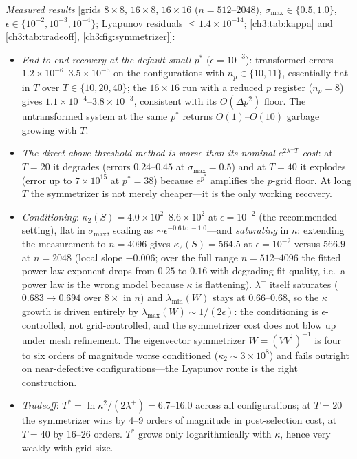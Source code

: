 \emph{Measured results} [grids $8\times8$, $16\times8$, $16\times16$
($n=512$--$2048$), $\sigma_{\max}\in\{0.5,1.0\}$,
$\epsilon\in\{10^{-2},10^{-3},10^{-4}\}$; Lyapunov residuals
$\le1.4\times10^{-14}$; \ref{ch3:tab:kappa} and \ref{ch3:tab:tradeoff},
\ref{ch3:fig:symmetrizer}]:
\begin{itemize}
\item \emph{End-to-end recovery at the default small $p^{*}$}
  ($\epsilon=10^{-3}$): transformed errors
  $1.2\times10^{-6}$--$3.5\times10^{-5}$ on the configurations with
  $n_p\in\{10,11\}$, essentially flat in $T$ over $T\in\{10,20,40\}$; the
  $16\times16$ run with a reduced $p$ register ($n_p=8$) gives
  $1.1\times10^{-4}$--$3.8\times10^{-3}$, consistent with its
  $O(\Delta p^{2})$ floor.  The untransformed system at the same $p^{*}$
  returns $O(1)$--$O(10)$ garbage growing with $T$.
\item \emph{The direct above-threshold method is worse than its nominal
  $e^{2\lambda^{+}T}$ cost}: at $T=20$ it degrades (errors $0.24$--$0.45$
  at $\sigma_{\max}=0.5$) and at $T=40$ it explodes (error up to
  $7\times10^{15}$ at $p^{*}=38$) because $e^{p^{*}}$ amplifies the
  $p$-grid floor.  At long $T$ the symmetrizer is not merely cheaper---it
  is the only working recovery.
\item \emph{Conditioning}:
  $\kappa_2(S)=4.0\times10^{2}$--$8.6\times10^{2}$ at $\epsilon=10^{-2}$
  (the recommended setting), flat in $\sigma_{\max}$, scaling as
  ${\sim}\epsilon^{-0.6\,\text{to}\,-1.0}$---and \emph{saturating} in
  $n$: extending the measurement to $n=4096$ gives
  $\kappa_2(S)=564.5$ at $\epsilon=10^{-2}$ versus $566.9$ at $n=2048$
  (local slope $-0.006$; over the full range $n=512$--$4096$ the fitted
  power-law exponent drops from $0.25$ to $0.16$ with degrading fit
  quality, i.e.\ a power law is the wrong model because $\kappa$ is
  flattening).  $\lambda^{+}$ itself saturates ($0.683\to0.694$ over
  $8\times$ in $n$) and $\lambda_{\min}(W)$ stays at $0.66$--$0.68$, so
  the $\kappa$ growth is driven entirely by
  $\lambda_{\max}(W)\sim1/(2\epsilon)$: the conditioning is
  $\epsilon$-controlled, not grid-controlled, and the symmetrizer cost
  does not blow up under mesh refinement.  The eigenvector symmetrizer
  $W=(VV^{\dagger})^{-1}$ is four to six orders of magnitude worse
  conditioned ($\kappa_2\sim3\times10^{8}$) and fails outright on
  near-defective configurations---the Lyapunov route is the right
  construction.
\item \emph{Tradeoff}:
  $T^{*}=\ln\kappa^{2}/(2\lambda^{+})=6.7$--$16.0$ across all
  configurations; at $T=20$ the symmetrizer wins by 4--9 orders of
  magnitude in post-selection cost, at $T=40$ by 16--26 orders.  $T^{*}$
  grows only logarithmically with $\kappa$, hence very weakly with grid
  size.
\end{itemize}

